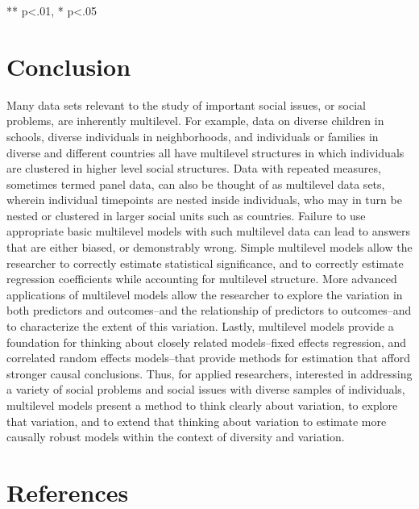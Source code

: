 \documentclass[
  letterpaper,
  DIV=11,
  numbers=noendperiod]{scrreprt}
\begin{document}
** p\textless.01, * p\textless.05


\hypertarget{conclusion}{%
\chapter{Conclusion}\label{conclusion}}

Many data sets relevant to the study of important social issues, or
social problems, are inherently multilevel. For example, data on diverse
children in schools, diverse individuals in neighborhoods, and
individuals or families in diverse and different countries all have
multilevel structures in which individuals are clustered in higher level
social structures. Data with repeated measures, sometimes termed panel
data, can also be thought of as multilevel data sets, wherein individual
timepoints are nested inside individuals, who may in turn be nested or
clustered in larger social units such as countries. Failure to use
appropriate basic multilevel models with such multilevel data can lead
to answers that are either biased, or demonstrably wrong. Simple
multilevel models allow the researcher to correctly estimate statistical
significance, and to correctly estimate regression coefficients while
accounting for multilevel structure. More advanced applications of
multilevel models allow the researcher to explore the variation in both
predictors and outcomes--and the relationship of predictors to
outcomes--and to characterize the extent of this variation. Lastly,
multilevel models provide a foundation for thinking about closely
related models--fixed effects regression, and correlated random effects
models--that provide methods for estimation that afford stronger causal
conclusions. Thus, for applied researchers, interested in addressing a
variety of social problems and social issues with diverse samples of
individuals, multilevel models present a method to think clearly about
variation, to explore that variation, and to extend that thinking about
variation to estimate more causally robust models within the context of
diversity and variation.


\hypertarget{references}{%
\chapter*{References}\label{references}}
\end{document}
